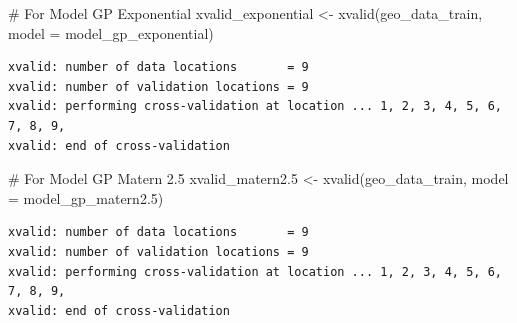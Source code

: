 \documentclass[
  11pt,
]{article}
\newenvironment{Shaded}{\begin{snugshade}}{\end{snugshade}}
\newcommand{\AttributeTok}[1]{\textcolor[rgb]{0.40,0.45,0.13}{#1}}
\newcommand{\CommentTok}[1]{\textcolor[rgb]{0.37,0.37,0.37}{#1}}
\newcommand{\FloatTok}[1]{\textcolor[rgb]{0.68,0.00,0.00}{#1}}
\newcommand{\FunctionTok}[1]{\textcolor[rgb]{0.28,0.35,0.67}{#1}}
\newcommand{\NormalTok}[1]{\textcolor[rgb]{0.00,0.23,0.31}{#1}}
\newcommand{\OtherTok}[1]{\textcolor[rgb]{0.00,0.23,0.31}{#1}}
\begin{document}
\begin{Shaded}
\begin{Highlighting}[]
\CommentTok{\# For Model GP Exponential}
\NormalTok{xvalid\_exponential }\OtherTok{\textless{}{-}} \FunctionTok{xvalid}\NormalTok{(geo\_data\_train, }\AttributeTok{model =}\NormalTok{ model\_gp\_exponential)}
\end{Highlighting}
\end{Shaded}

\begin{verbatim}
xvalid: number of data locations       = 9
xvalid: number of validation locations = 9
xvalid: performing cross-validation at location ... 1, 2, 3, 4, 5, 6, 7, 8, 9, 
xvalid: end of cross-validation
\end{verbatim}

\begin{Shaded}
\begin{Highlighting}[]
\CommentTok{\# For Model GP Matern 2.5}
\NormalTok{xvalid\_matern2}\FloatTok{.5} \OtherTok{\textless{}{-}} \FunctionTok{xvalid}\NormalTok{(geo\_data\_train, }\AttributeTok{model =}\NormalTok{ model\_gp\_matern2}\FloatTok{.5}\NormalTok{)}
\end{Highlighting}
\end{Shaded}

\begin{verbatim}
xvalid: number of data locations       = 9
xvalid: number of validation locations = 9
xvalid: performing cross-validation at location ... 1, 2, 3, 4, 5, 6, 7, 8, 9, 
xvalid: end of cross-validation
\end{verbatim}
\end{document}
